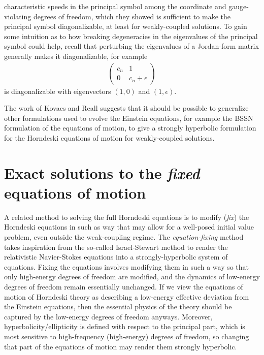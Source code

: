 \documentclass{ws-ijmpd}
\begin{document}
characteristic speeds in the principal symbol
among the coordinate and gauge-violating degrees of freedom, 
which they showed is sufficient to make the principal symbol diagonalizable, 
at least for weakly-coupled solutions\cite{Kovacs:2020pns,Kovacs:2020ywu}.
To gain some intuition as to how breaking degeneracies in the eigenvalues
of the principal symbol could help, recall that perturbing
the eigenvalues of a Jordan-form matrix generally makes it
diagonalizable, for example 
\begin{align}
   \begin{pmatrix}
      c_n & 1 \\
      0   & c_n+\epsilon
   \end{pmatrix}
\end{align}
is diagonalizable 
with eigenvectors $(1,0)$ and $(1,\epsilon)$.

The work of Kovacs and Reall suggests that it should be possible
to generalize other formulations used to evolve the Einstein
equations, for example the BSSN formulation of the equations of 
motion\cite{Shibata:1995we,Baumgarte:1998te},
to give a strongly hyperbolic formulation for the
Horndeski equations of motion for weakly-coupled solutions.

\section{Exact solutions to the \emph{fixed}
equations of motion\label{sec:fixing_eqns}}

A related method to solving the full Horndeski equations is to
modify (\emph{fix}) the Horndeski equations in such as way that may allow
for a well-posed initial value problem, even outside the 
weak-coupling regime.
The \emph{equation-fixing} method takes inspiration from the so-called
Israel-Stewart method\cite{Israel:1976tn,1976PhLA...58..213I,Israel:1979wp} 
to render the relativistic Navier-Stokes
equations into a strongly-hyperbolic system of 
equations\cite{Cayuso:2017iqc,Allwright:2018rut}.
Fixing the equations involves modifying them in such a
way so that only high-energy degrees of freedom are modified, 
and the dynamics of
low-energy degrees of freedom remain essentially unchanged.
If we view the equations of motion of Horndeski theory as describing
a low-energy effective deviation from the Einstein equations,
then the essential physics of the theory should be captured
by the low-energy degrees of freedom anyways.
Moreover, hyperbolicity/ellipticity is defined with respect
to the principal part, which is most sensitive to high-frequency
(high-energy) degrees of freedom, so changing that part of the
equations of motion may render them strongly hyperbolic.
\end{document}
